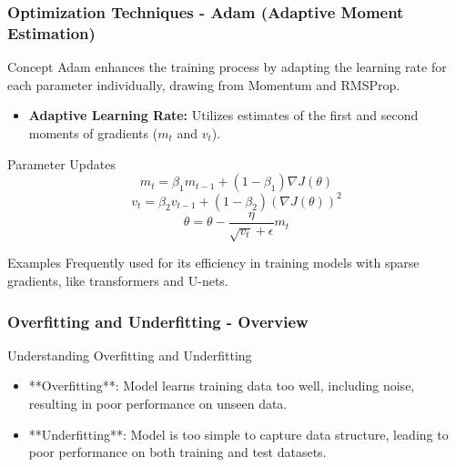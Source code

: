 \documentclass[aspectratio=169]{beamer}
\begin{document}
\begin{frame}[fragile]
    \frametitle{Optimization Techniques - Adam (Adaptive Moment Estimation)}
    \begin{block}{Concept}
        Adam enhances the training process by adapting the learning rate for each parameter individually, drawing from Momentum and RMSProp.
    \end{block}

    \begin{itemize}
        \item \textbf{Adaptive Learning Rate:} Utilizes estimates of the first and second moments of gradients ($m_t$ and $v_t$).
    \end{itemize}

    \begin{block}{Parameter Updates}
        \begin{equation}
        m_t = \beta_1 m_{t-1} + (1 - \beta_1) \nabla J(\theta)
        \end{equation}
        \begin{equation}
        v_t = \beta_2 v_{t-1} + (1 - \beta_2) (\nabla J(\theta))^2
        \end{equation}
        \begin{equation}
        \theta = \theta - \frac{\eta}{\sqrt{v_t} + \epsilon} m_t
        \end{equation}
    \end{block}

    \begin{block}{Examples}
        Frequently used for its efficiency in training models with sparse gradients, like transformers and U-nets.
    \end{block}
\end{frame}

\begin{frame}[fragile]
    \frametitle{Overfitting and Underfitting - Overview}
    \begin{block}{Understanding Overfitting and Underfitting}
        \begin{itemize}
            \item **Overfitting**: Model learns training data too well, including noise, resulting in poor performance on unseen data.
            \item **Underfitting**: Model is too simple to capture data structure, leading to poor performance on both training and test datasets.
        \end{itemize}
    \end{block}
\end{frame}
\end{document}
